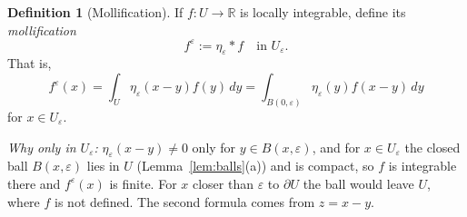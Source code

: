 \documentclass[11pt]{article}
\theoremstyle{plain}
\theoremstyle{definition}
\newtheorem{definition}[theorem]{Definition}
\theoremstyle{remark}
\begin{document}
\begin{definition}[Mollification]
If $f : U \to \mathbb{R}$ is locally integrable, define its \emph{mollification}
$$ f^\varepsilon := \eta_\varepsilon * f \quad \text{in } U_\varepsilon. $$
That is,
$$ f^\varepsilon(x) = \int_U \eta_\varepsilon(x - y) f(y)\, dy = \int_{B(0,\varepsilon)} \eta_\varepsilon(y) f(x-y)\, dy $$
for $x \in U_\varepsilon$.
\end{definition}
\emph{Why only in $U_\varepsilon$:} $\eta_\varepsilon(x - y) \neq 0$ only for $y \in B(x,\varepsilon)$, and for $x \in U_\varepsilon$ the closed ball $B(x,\varepsilon)$ lies in $U$ (Lemma~\ref{lem:balls}(a)) and is compact, so $f$ is integrable there and $f^\varepsilon(x)$ is finite. For $x$ closer than $\varepsilon$ to $\partial U$ the ball would leave $U$, where $f$ is not defined. The second formula comes from $z = x - y$.
\end{document}
